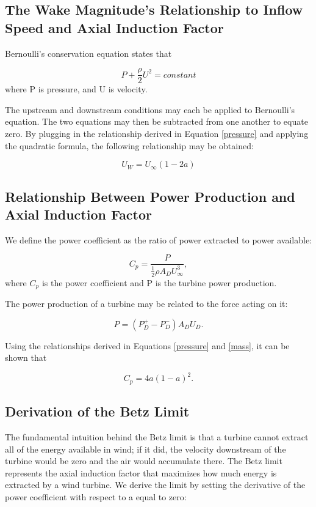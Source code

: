 \documentclass{article}
\begin{document}
\subsection{The Wake Magnitude's Relationship to Inflow Speed and Axial Induction Factor}
Bernoulli's conservation equation states that 

\begin{equation}
P + \frac{\rho}{2}U^2 = constant
\end{equation}
where P is pressure, and U is velocity.

The upstream and downstream conditions may each be applied to Bernoulli's equation. The two equations may then be subtracted from one another to equate zero. By plugging in the relationship derived in Equation \ref{pressure} and applying the quadratic formula, the following relationship may be obtained:

\begin{equation}
U_W = U_{\infty}(1-2a)
\end{equation}

\subsection{Relationship Between Power Production and Axial Induction Factor}

We define the power coefficient as the ratio of power extracted to power available:

\begin{equation}
C_p = \frac{P}{\frac{1}{2}\rho A_D U_\infty^3},
\end{equation}
where $C_p$ is the power coefficient and P is the turbine power production.

The power production of a turbine may be related to the force acting on it:

\begin{equation}
P = (P_D^+ - P_D^-) A_D U_D.
\end{equation}

Using the relationships derived in Equations \ref{pressure} and \ref{mass}, it can be shown that 

\begin{equation}
C_p = 4a(1-a)^2.
\end{equation}

\subsection{Derivation of the Betz Limit}
The fundamental intuition behind the Betz limit is that a turbine cannot extract all of the energy available in wind; if it did, the velocity downstream of the turbine would be zero and the air would accumulate there. The Betz limit represents the axial induction factor that maximizes how much energy is extracted by a wind turbine. We derive the limit by setting the derivative of the power coefficient with respect to a equal to zero:
\end{document}
